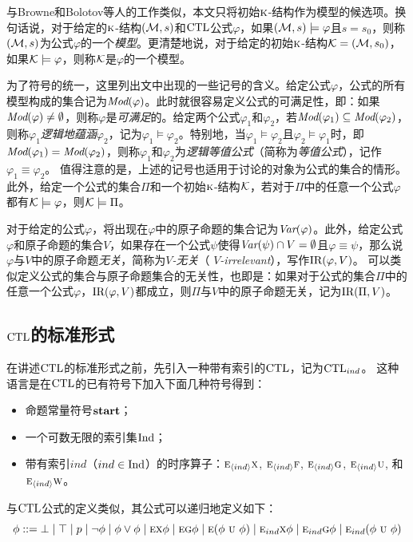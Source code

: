 与Browne和Bolotov等人的工作类似，本文只将初始$\textsc{k}$-结构作为模型的候选项\cite{browne1988characterizing,Bolotov:1999:JETAI}。换句话说，对于给定的$\textsc{k}$-结构$({\cal M},s)$和$\textrm{CTL}$公式$\varphi$，如果$({\cal M},s)\models \varphi$且$s = s_0$，则称$({\cal M},s)$为公式$\varphi$的一个\emph{模型}。更清楚地说，对于给定的初始$\textsc{k}$-结构${\cal K}=({\cal M},s_0)$，如果${\cal K} \models \varphi$，则称$\cal K$是$\varphi$的一个模型。

为了符号的统一，这里列出文中出现的一些记号的含义。给定公式$\varphi$，公式的所有模型构成的集合记为$\textit{Mod}(\varphi)$。此时就很容易定义公式的可满足性，即：如果$\textit{Mod}(\varphi)\not = \emptyset$，则称$\varphi$是\emph{可满足}的。给定两个公式$\varphi_1$和$\varphi_2$，若$\textit{Mod}(\varphi_1)\subseteq \textit{Mod}(\varphi_2)$，则称$\varphi_1$\emph{逻辑地蕴涵}$\varphi_2$，记为$\varphi_1\models \varphi_2$。特别地，当$\varphi_1\models \varphi_2$且$\varphi_2\models \varphi_1$时，即$\textit{Mod}(\varphi_1)= \textit{Mod}(\varphi_2)$，则称$\varphi_1$和$\varphi_2$为\emph{逻辑等值公式}（简称为\emph{等值公式}），记作$\varphi_1 \equiv \varphi_2$。
值得注意的是，上述的记号也适用于讨论的对象为公式的集合的情形。
此外，给定一个公式的集合$\Pi$和一个初始$\textsc{k}$-结构$\cal K$，若对于$\Pi$中的任意一个公式$\varphi$都有${\cal K} \models \varphi$，则${\cal K} \models \Pi$。

对于给定的公式$\varphi$，将出现在$\varphi$中的原子命题的集合记为$\textit{Var}(\varphi)$。此外，给定公式$\varphi$和原子命题的集合$V$，如果存在一个公式$\psi$使得$\textit{Var}(\psi) \cap V = \emptyset$且$\varphi \equiv \psi$，那么说$\varphi$与$V$中的原子命题\emph{无关}，简称为\emph{$V$-无关}（ \emph{$V$-irrelevant}），写作$\textrm{IR}(\varphi,V)$。
可以类似定义公式的集合与原子命题集合的无关性，也即是：如果对于公式的集合$\Pi$中的任意一个公式$\varphi$，$\textrm{IR}(\varphi,V)$都成立，则$\Pi$与$V$中的原子命题无关，记为$\textrm{IR}(\Pi,V)$。

\subsection{$\textrm{CTL}$的标准形式}

在讲述$\textrm{CTL}$的标准形式之前，先引入一种带有索引的$\textrm{CTL}$，记为$\textrm{CTL}_{ind}$。
这种语言是在$\textrm{CTL}$的已有符号下加入下面几种符号得到：
\begin{itemize}
	\item 命题常量符号$\textbf{start}$；
	\item 一个可数无限的索引集$\textrm{Ind}$；
	\item 带有索引$ind$（$ind \in \textrm{Ind}$）的时序算子：$\textsc{e}_{{\langle{ind}\rangle}} \textsc{x}$, $\textsc{e}_{{\langle{ind}\rangle}} \textsc{f}$, $\textsc{e}_{{\langle{ind}\rangle}} \textsc{g}$, $\textsc{e}_{{\langle{ind}\rangle}} \textsc{u}$, 和 $\textsc{e}_{{\langle{ind}\rangle}} \textsc{w}$。
\end{itemize}
与$\textrm{CTL}$公式的定义类似，其公式可以递归地定义如下：
\begin{equation}\label{def:CTL_ind:formulas}
	\phi ::=  \bot \mid \top \mid p \mid\neg\phi \mid \phi\lor\phi \mid
	\textsc{e} \textsc{x} \phi \mid
	\textsc{e} \textsc{g} \phi \mid
	\textsc{e} (\phi\ \textsc{u}\ \phi)\mid
	\textsc{e}_{ind} \textsc{x} \phi \mid
	\textsc{e}_{ind} \textsc{g} \phi \mid
	\textsc{e}_{ind} (\phi\ \textsc{u}\ \phi)
\end{equation}

